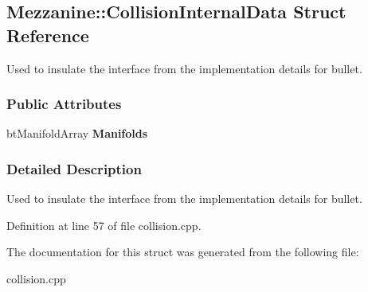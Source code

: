 \hypertarget{structMezzanine_1_1CollisionInternalData}{
\subsection{Mezzanine::CollisionInternalData Struct Reference}
\label{structMezzanine_1_1CollisionInternalData}
}


Used to insulate the interface from the implementation details for bullet.  


\subsubsection*{Public Attributes}
\begin{DoxyCompactItemize}
\item 
\hypertarget{structMezzanine_1_1CollisionInternalData_a9f62c525b0438ef18a6475d78474c340}{
btManifoldArray {\bfseries Manifolds}}
\label{structMezzanine_1_1CollisionInternalData_a9f62c525b0438ef18a6475d78474c340}

\end{DoxyCompactItemize}


\subsubsection{Detailed Description}
Used to insulate the interface from the implementation details for bullet. 

Definition at line 57 of file collision.cpp.



The documentation for this struct was generated from the following file:\begin{DoxyCompactItemize}
\item 
collision.cpp\end{DoxyCompactItemize}
